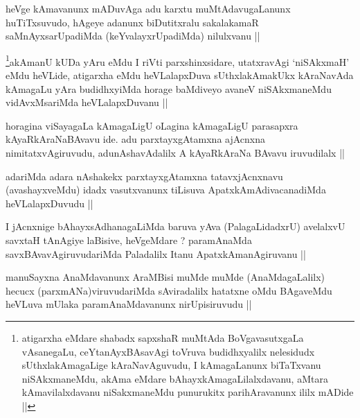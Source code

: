 \begin{artha}
heVge kAmavanunx mADuvAga adu karxtu muMtAdavugaLanunx huTiTxsuvudo,
hAgeye adanunx biDutitxralu sakalakamaR saMnAyxsarUpadiMda
(keYvalayxrUpadiMda) nilulxvanu ||
\end{artha}


\begin{artha}
\footnote{atigarxha eMdare shabadx sapxshaR muMtAda BoVgavasutxgaLa
  vAsanegaLu, ceYtanAyxBAsavAgi toVruva budidhxyalilx nelesidudx
  sUthxlakAmagaLige kAraNavAguvudu, I kAmagaLanunx biTaTxvanu
  niSAkxmaneMdu, akAma eMdare bAhayxkAmagaLilalxdavanu, aMtara
  kAmavilalxdavanu niSakxmaneMdu punurukitx parihAravanunx ililx
  mADide ||}akAmanU kUDa yAru eMdu I riVti parxshinxsidare, utatxravAgi
`niSAkxmaH' eMdu heVLide, atigarxha eMdu heVLalapxDuva sUthxlakAmakUkx
kAraNavAda kAmagaLu yAra budidhxyiMda horage baMdiveyo avaneV
niSAkxmaneMdu vidAvxMsariMda heVLalapxDuvanu ||
\end{artha}

\begin{artha}
horagina viSayagaLa kAmagaLigU oLagina kAmagaLigU parasapxra
kAyaRkAraNaBAvavu ide. adu parxtayxgAtamxna ajAcnxna
nimitatxvAgiruvudu, adunAshavAdalilx A kAyaRkAraNa BAvavu iruvudilalx ||
\end{artha}


\begin{artha}
adariMda adara nAshakekx parxtayxgAtamxna tatavxjAcnxnavu
(avashayxveMdu) idadx vasutxvanunx tiLisuva ApatxkAmAdivacanadiMda
heVLalapxDuvudu ||
\end{artha}


\begin{artha}
I jAcnxnige bAhayxsAdhanagaLiMda baruva yAva (PalagaLidadxrU)
avelalxvU savxtaH tAnAgiye laBisive, heVgeMdare  ? paramAnaMda
savxBAvavAgiruvudariMda Paladalilx Itanu ApatxkAmanAgiruvanu ||
\end{artha}


\begin{artha}
manuSayxna AnaMdavanunx AraMBisi muMde muMde (AnaMdagaLalilx) hecucx
(parxmANa)viruvudariMda sAviradalilx hatatxne oMdu BAgaveMdu heVLuva
mUlaka paramAnaMdavanunx nirUpisiruvudu ||
\end{artha}

